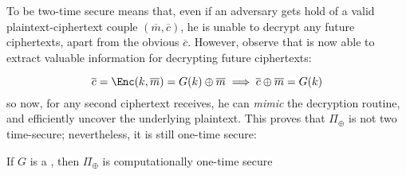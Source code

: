 To be two-time secure means that, even if an adversary \adversary{} gets hold of a valid plaintext-ciphertext couple $(\overline{m}, \overline{c})$, he is unable to decrypt any future ciphertexts\footnotemark, apart from the obvious $\overline{c}$. However, observe that \adversary{} is now able to extract valuable information for decrypting future ciphertexts:


\[
    \overline{c} = \Enc(k, \overline{m}) = G(k) \oplus \overline{m} \implies \overline{c} \oplus \overline{m} = G(k)
\]
so now, for any second ciphertext \adversary{} receives, he can \emph{mimic} the decryption routine, and efficiently uncover the underlying plaintext. This proves that $\Pi_\oplus$ is not two time-secure; nevertheless, it is still one-time secure:

\begin{theorem}
    If $G$ is a \prg, then $\Pi_\oplus$ is computationally one-time secure
\end{theorem}

